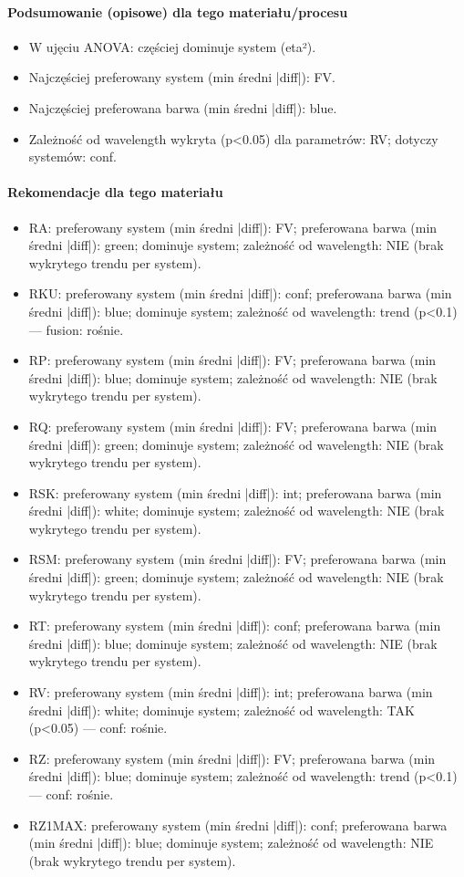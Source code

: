 \documentclass[
  10pt,
]{article}
\begin{document}
\paragraph{Podsumowanie (opisowe) dla tego materiału/procesu}
\begin{itemize}
\item W ujęciu ANOVA: częściej dominuje system (eta²).
\item Najczęściej preferowany system (min średni |diff|): FV.
\item Najczęściej preferowana barwa (min średni |diff|): blue.
\item Zależność od wavelength wykryta (p<0.05) dla parametrów: RV; dotyczy systemów: conf.
\end{itemize}
\paragraph{Rekomendacje dla tego materiału}
\begin{itemize}
\item RA: preferowany system (min średni |diff|): FV; preferowana barwa (min średni |diff|): green; dominuje system; zależność od wavelength: NIE (brak wykrytego trendu per system).
\item RKU: preferowany system (min średni |diff|): conf; preferowana barwa (min średni |diff|): blue; dominuje system; zależność od wavelength: trend (p<0.1) — fusion: rośnie.
\item RP: preferowany system (min średni |diff|): FV; preferowana barwa (min średni |diff|): blue; dominuje system; zależność od wavelength: NIE (brak wykrytego trendu per system).
\item RQ: preferowany system (min średni |diff|): FV; preferowana barwa (min średni |diff|): green; dominuje system; zależność od wavelength: NIE (brak wykrytego trendu per system).
\item RSK: preferowany system (min średni |diff|): int; preferowana barwa (min średni |diff|): white; dominuje system; zależność od wavelength: NIE (brak wykrytego trendu per system).
\item RSM: preferowany system (min średni |diff|): FV; preferowana barwa (min średni |diff|): green; dominuje system; zależność od wavelength: NIE (brak wykrytego trendu per system).
\item RT: preferowany system (min średni |diff|): conf; preferowana barwa (min średni |diff|): blue; dominuje system; zależność od wavelength: NIE (brak wykrytego trendu per system).
\item RV: preferowany system (min średni |diff|): int; preferowana barwa (min średni |diff|): white; dominuje system; zależność od wavelength: TAK (p<0.05) — conf: rośnie.
\item RZ: preferowany system (min średni |diff|): FV; preferowana barwa (min średni |diff|): blue; dominuje system; zależność od wavelength: trend (p<0.1) — conf: rośnie.
\item RZ1MAX: preferowany system (min średni |diff|): conf; preferowana barwa (min średni |diff|): blue; dominuje system; zależność od wavelength: NIE (brak wykrytego trendu per system).
\end{itemize}
\end{document}
